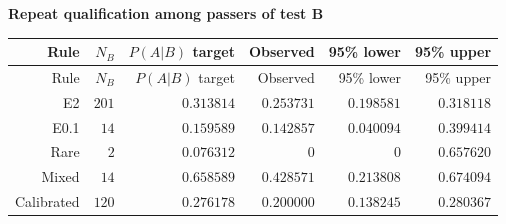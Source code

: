 
\begingroup\small
\setlength{\tabcolsep}{4pt}
\noindent\textbf{Repeat qualification among passers of test B}
\begin{longtable}{rrrrrr}
\toprule
Rule & $N_B$ & $P(A|B)$ target & Observed & 95\% lower & 95\% upper \\
\midrule
\endfirsthead
Rule & $N_B$ & $P(A|B)$ target & Observed & 95\% lower & 95\% upper \\
\midrule
\endhead
\bottomrule
\endfoot
E2 & $201$ & $0.313814$ & $0.253731$ & $0.198581$ & $0.318118$ \\
E0.1 & $14$ & $0.159589$ & $0.142857$ & $0.040094$ & $0.399414$ \\
Rare & $2$ & $0.076312$ & $0$ & $0$ & $0.657620$ \\
Mixed & $14$ & $0.658589$ & $0.428571$ & $0.213808$ & $0.674094$ \\
Calibrated & $120$ & $0.276178$ & $0.200000$ & $0.138245$ & $0.280367$ \\
\end{longtable}
\endgroup
